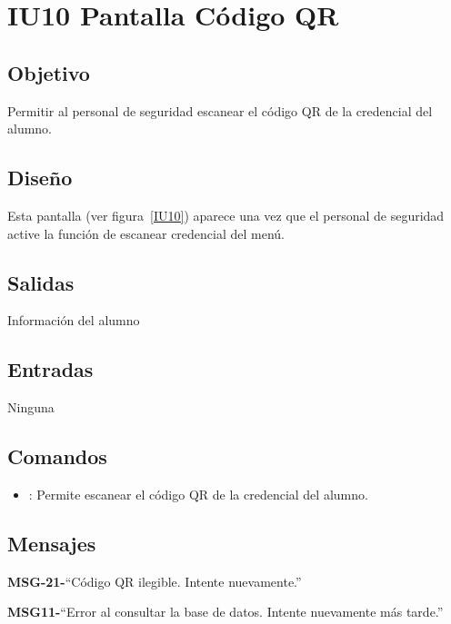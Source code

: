 \section{IU10 Pantalla Código QR}

\subsection{Objetivo}
Permitir al personal de seguridad escanear el código QR de la credencial del alumno.

\subsection{Diseño}
Esta pantalla  (ver figura~\ref{IU10}) aparece una vez que el personal de seguridad active la función de escanear credencial del menú. 


\subsection{Salidas}
Información del alumno

\subsection{Entradas}
Ninguna

\subsection{Comandos}
\begin{itemize}
	\item {}: Permite escanear el código QR de la credencial del alumno.
\end{itemize}

\subsection{Mensajes}

\begin{Citemize}
	\item {\bf MSG-21-}{``Código QR ilegible. Intente nuevamente.''}
	\item {\bf MSG11-}{``Error al consultar la base de datos. Intente nuevamente más tarde.''}
\end{Citemize}

